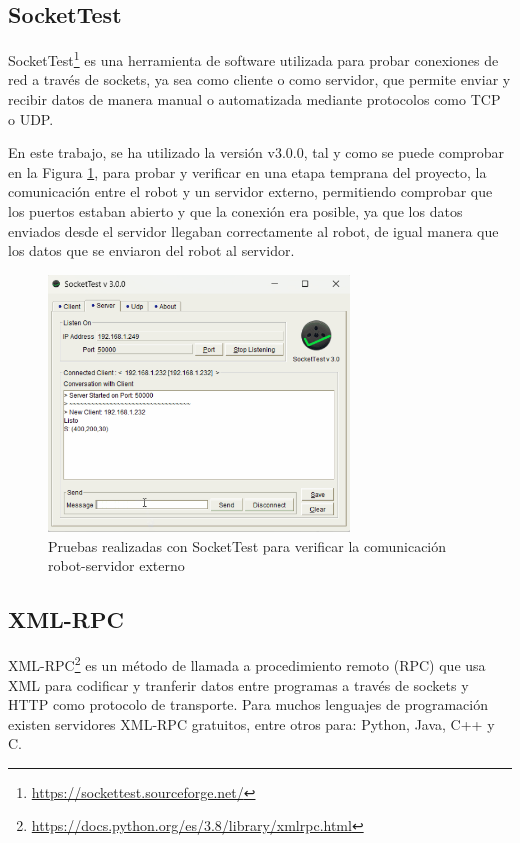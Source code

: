 \subsection{SocketTest}
\label{sec:SocketTest}

SocketTest\footnote{\url{https://sockettest.sourceforge.net/}} es una herramienta de software utilizada para probar conexiones de red a través de sockets, ya sea como cliente o como servidor, que permite enviar y recibir datos de manera manual o automatizada mediante protocolos como TCP o UDP.

En este trabajo, se ha utilizado la versión v3.0.0, tal y como se puede comprobar en la Figura \ref{fig:socket}, para probar y verificar en una etapa temprana del proyecto, la comunicación entre el robot y un servidor externo, permitiendo comprobar que los puertos estaban abierto y que la conexión era posible, ya que los datos enviados desde el servidor llegaban correctamente al robot, de igual manera que los datos que se enviaron del robot al servidor.

\begin{figure} [H]
    \begin{center}
      \includegraphics[width=8cm]{figs/pruebas_socket_test.png}
    \end{center}
    \caption{Pruebas realizadas con SocketTest para verificar la comunicación robot-servidor externo}
    \label{fig:socket}
\end{figure}

\subsection{XML-RPC}
\label{sec:XMLRPC}

XML-RPC\footnote{\url{https://docs.python.org/es/3.8/library/xmlrpc.html}} es un método de llamada a procedimiento remoto (RPC) que usa XML para codificar y tranferir datos entre programas a través de sockets y HTTP como protocolo de transporte. Para muchos lenguajes de programación existen servidores XML-RPC gratuitos, entre otros para: Python, Java, C++ y C.\\

